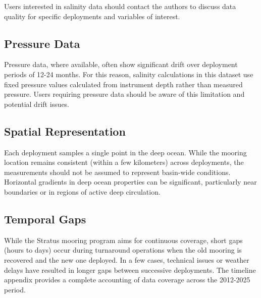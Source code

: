 Users interested in salinity data should contact the authors to discuss data quality for specific deployments and variables of interest.

\subsection{Pressure Data}

Pressure data, where available, often show significant drift over deployment periods of 12-24 months. For this reason, salinity calculations in this dataset use fixed pressure values calculated from instrument depth rather than measured pressure. Users requiring pressure data should be aware of this limitation and potential drift issues.

\subsection{Spatial Representation}

Each deployment samples a single point in the deep ocean. While the mooring location remains consistent (within a few kilometers) across deployments, the measurements should not be assumed to represent basin-wide conditions. Horizontal gradients in deep ocean properties can be significant, particularly near boundaries or in regions of active deep circulation.

\subsection{Temporal Gaps}

While the Stratus mooring program aims for continuous coverage, short gaps (hours to days) occur during turnaround operations when the old mooring is recovered and the new one deployed. In a few cases, technical issues or weather delays have resulted in longer gaps between successive deployments. The timeline appendix provides a complete accounting of data coverage across the 2012-2025 period.
